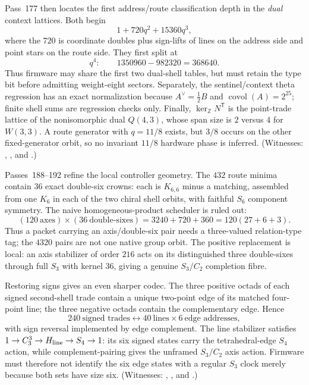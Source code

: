 \documentclass[11pt]{article}
\begin{document}
Pass~177 then locates the first address/route classification depth in the
\emph{dual} context lattices.  Both begin
\[
 1+720q^2+15360q^3,
\]
where the $720$ is coordinate doubles plus sign-lifts of lines on the
address side and point stars on the route side.  They first split at
\[
 q^4:\qquad 1350960-982320=368640.
\]
Thus firmware may share the first two dual-shell tables, but must retain
the type bit before admitting weight-eight sectors.  Separately, the
sentinel/context theta regression has an exact normalization because
$A^\vee=\tfrac12B$ and $\operatorname{covol}(A)=2^{25}$; finite shell sums
are regression checks only.  Finally,
$\ker_{\mathbb Z}N^{\mathsf T}$ is the point-trade lattice of the
nonisomorphic dual $Q(4,3)$, whose span size is $2$ versus $4$ for
$W(3,3)$.  A route generator with $q=11/8$ exists, but $3/8$ occurs on
the other fixed-generator orbit, so no invariant $11/8$ hardware phase
is inferred.  (Witnesses:
,
, and
.)

Passes~188--192 refine the local controller geometry.  The $432$ route
minima contain $36$ exact double-six crowns: each is
$K_{6,6}$ minus a matching, assembled from one $K_6$ in each of the two
chiral shell orbits, with faithful $S_6$ component symmetry.  The naive
homogeneous-product scheduler is ruled out:
\[
 (120\ \text{axes})\times(36\ \text{double-sixes})
 =3240+720+360=120(27+6+3).
\]
Thus a packet carrying an axis/double-six pair needs a three-valued
relation-type tag; the $4320$ pairs are not one native group orbit.  The
positive replacement is local: an axis stabilizer of order $216$ acts on
its distinguished three double-sixes through full $S_3$ with kernel $36$,
giving a genuine $S_3/C_2$ completion fibre.

Restoring signs gives an even sharper codec.  The three positive octads
of each signed second-shell trade contain a unique two-point edge of its
matched four-point line; the three negative octads contain the
complementary edge.  Hence
\[
 240\ \text{signed trades}\longleftrightarrow40\ \text{lines}\times6\
 \text{edge addresses},
\]
with sign reversal implemented by edge complement.  The line stabilizer
satisfies $1\to C_3^3\to H_{\rm line}\to S_4\to1$: its six signed states
carry the tetrahedral-edge $S_4$ action, while complement-pairing gives
the unframed $S_3/C_2$ axis action.  Firmware must therefore not identify
the six edge states with a regular $S_3$ clock merely because both sets
have size six.  (Witnesses:
,
, and
.)
\end{document}
